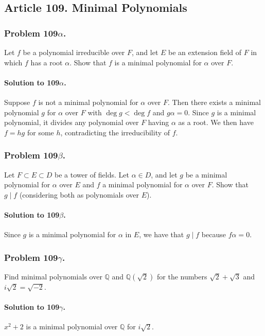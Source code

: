\subsection{Article 109. Minimal Polynomials}

\subsubsection{Problem 109$\alpha$.}
Let $f$ be a polynomial irreducible over $F$, and let $E$ be an extension
field of $F$ in which $f$ has a root $\alpha$. Show that $f$ is a minimal
polynomial for $\alpha$ over $F$.

\paragraph{Solution to 109$\alpha$.}
Suppose $f$ is not a minimal polynomial for $\alpha$ over $F$. Then there
exists a minimal polynomial $g$ for $\alpha$ over $F$ with $\deg g < \deg f$
and $g\alpha = 0$. Since $g$ is a minimal polynomial, it divides any polynomial
over $F$ having $\alpha$ as a root. We then have $f = hg$ for some $h$,
contradicting the irreducibility of $f$.

\subsubsection{Problem 109$\beta$.}
Let $F \subset E \subset D$ be a tower of fields. Let $\alpha \in D$, and let
$g$ be a minimal polynomial for $\alpha$ over $E$ and $f$ a minimal polynomial
for $\alpha$ over $F$. Show that $g \mid f$ (considering both as polynomials
over $E$).

\paragraph{Solution to 109$\beta$.}
Since $g$ is a minimal polynomial for $\alpha$ in $E$, we
have that $g \mid f$ because $f\alpha = 0$.

\subsubsection{Problem 109$\gamma$.}
Find minimal polynomials over $\mathbb{Q}$ and $\mathbb{Q}(\sqrt{2})$ for the
numbers $\sqrt{2} + \sqrt{3}$ and $i\sqrt{2} = \sqrt{-2}$.

\paragraph*{Solution to 109$\gamma$.}
$x^2 + 2$ is a minimal polynomial over $\mathbb{Q}$ for $i\sqrt{2}$.
